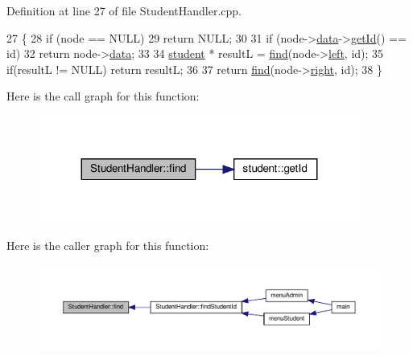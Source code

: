 Definition at line 27 of file Student\+Handler.\+cpp.


\begin{DoxyCode}
27                                                               \{
28     \textcolor{keywordflow}{if} (node == NULL)
29         \textcolor{keywordflow}{return} NULL;
30 
31     \textcolor{keywordflow}{if} (node->\hyperlink{class_node_a8b322cc3cc17b752eb77533493713ddd}{data}->\hyperlink{classstudent_a718b1fdd02dd1ed06110f9e0e7ec7720}{getId}() == id)
32         \textcolor{keywordflow}{return} node->\hyperlink{class_node_a8b322cc3cc17b752eb77533493713ddd}{data};
33 
34     \hyperlink{classstudent}{student} * resultL = \hyperlink{class_student_handler_a366b1628971d8b8ae437a87978e26e8a}{find}(node->\hyperlink{class_node_abb08a8b3137dd8fc8874348a439e01b4}{left}, \textcolor{keywordtype}{id});
35     \textcolor{keywordflow}{if}(resultL != NULL) \textcolor{keywordflow}{return} resultL;
36 
37     \textcolor{keywordflow}{return} \hyperlink{class_student_handler_a366b1628971d8b8ae437a87978e26e8a}{find}(node->\hyperlink{class_node_a34452c0684d3cb1590406ad201b43e65}{right}, \textcolor{keywordtype}{id});
38 \}
\end{DoxyCode}
Here is the call graph for this function\+:
\nopagebreak
\begin{figure}[H]
\begin{center}
\leavevmode
\includegraphics[width=299pt]{class_student_handler_a366b1628971d8b8ae437a87978e26e8a_cgraph}
\end{center}
\end{figure}
Here is the caller graph for this function\+:
\nopagebreak
\begin{figure}[H]
\begin{center}
\leavevmode
\includegraphics[width=350pt]{class_student_handler_a366b1628971d8b8ae437a87978e26e8a_icgraph}
\end{center}
\end{figure}
\mbox{\label{class_student_handler_ad54072af22b0b84e677af69426ed0bff}} 
